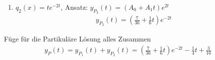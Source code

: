 \documentclass[a4paper]{article}
\begin{document}
\begin{multicols}{2}
\begin{fmerke}
\begin{enumerate}
\begin{enumerate}
					\item $q_2(x) = t e^{-2t}$, Ansatz: $y_{P_2}(t) = (A_0 + A_1t) e^{2t}$
					\begin{align*}
						 y_{P_2}(t) = \left(\frac{7}{36} + \frac{1}{6}t \right) e^{-2t}
					\end{align*}
				\end{enumerate}
				Füge für die Partikuläre Lösung alles Zusammen
				\begin{align*}
					y_P(t) = y_{P_1}(t) + y_{P_2}(t) = \left(\frac{7}{36} + \frac{1}{6}t\right) e^{-2t} -\frac{1}{4} t + \frac{3}{16}
				\end{align*}


\end{enumerate}
\end{fmerke}
\end{multicols}
\end{document}
